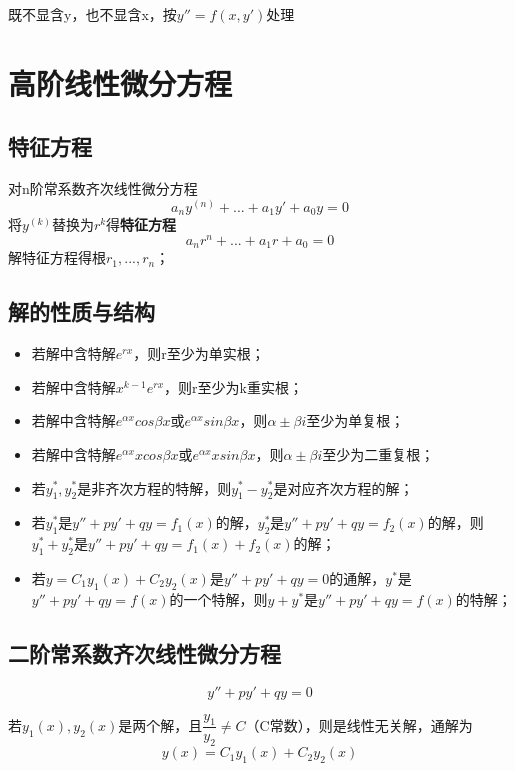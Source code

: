 既不显含y，也不显含x，按\(y'' = f(x, y')\)处理


\section{高阶线性微分方程}

\subsection{特征方程}
对n阶常系数齐次线性微分方程\[a_ny^{(n)} + ... + a_1y' + a_0y = 0\]
将\(y^{(k)}\)替换为\(r^k\)得\textbf{特征方程}\[a_nr^n + ... + a_1r + a_0 = 0\]
解特征方程得根\(r_1, ..., r_n\)；


\subsection{解的性质与结构}
\begin{itemize}
    \item 若解中含特解\(e^{rx}\)，则r至少为单实根；
    \item 若解中含特解\(x^{k - 1}e^{rx}\)，则r至少为k重实根；
    \item 若解中含特解\(e^{\alpha x}cos\beta x\)或\(e^{\alpha x}sin\beta x\)，则\(\alpha \pm \beta i\)至少为单复根；
    \item 若解中含特解\(e^{\alpha x}xcos\beta x\)或\(e^{\alpha x}xsin\beta x\)，则\(\alpha \pm \beta i\)至少为二重复根；
    
    \item 若\(y_1^*, y_2^*\)是非齐次方程的特解，则\(y_1^* - y_2^*\)是对应齐次方程的解；

    \item 若\(y_1^*\)是\(y'' + py' + qy = f_1(x)\)的解，\(y_2^*\)是\(y'' + py' + qy = f_2(x)\)的解，则\(y_1^* + y_2^*\)是\(y'' + py' + qy = f_1(x) + f_2(x)\)的解；

    \item 若\(y = C_1y_1(x) + C_2y_2(x)\)是\(y'' + py' + qy = 0\)的通解，\(y^*\)是\(y'' + py' + qy = f(x)\)的一个特解，则\(y + y^*\)是\(y'' + py' + qy = f(x)\)的特解；
\end{itemize}


\subsection{二阶常系数齐次线性微分方程}
\[y'' + py' + qy = 0\]

若\(y_1(x),y_2(x)\)是两个解，且\(\dfrac{y_1}{y_2} \neq C\)（C常数），则是线性无关解，通解为\[y(x) = C_1y_1(x) + C_2y_2(x)\]

